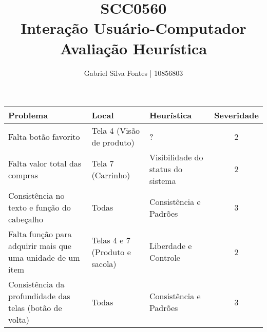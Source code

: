 \documentclass[12pt]{article}
\title{SCC0560 \\ Interação Usuário-Computador \\ Avaliação Heurística}
\author{Gabriel Silva Fontes | 10856803}
\begin{document}
\maketitle
\begin{center}
\begin{tabular}{C{9em} C{7em} C{8em} c}
    Problema & Local & Heurística & Severidade \\
    \toprule
    Falta botão favorito & Tela 4 (Visão de produto) &? & 2 \\
    Falta valor total das compras & Tela 7 (Carrinho) & Visibilidade do status do sistema & 2 \\
    Consistência no texto e função do cabeçalho & Todas & Consistência e Padrões & 3 \\
    Falta função para adquirir mais que uma unidade de um item & Telas 4 e 7 (Produto e sacola) & Liberdade e Controle & 2 \\
    Consistência da profundidade das telas (botão de volta) & Todas & Consistência e Padrões & 3 \\
\end{tabular}
\end{center}
\end{document}
